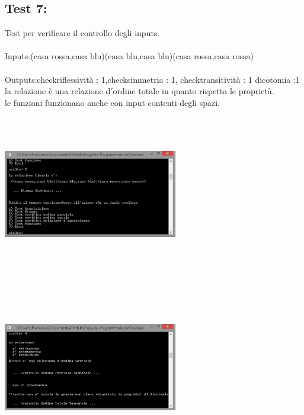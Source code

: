 \documentclass[11pt, a4paper, titlepage, block]{article}
\begin{document}
	\subsection{Test 7:}
	Test per verificare il controllo degli inputs.\\
	\\
	Inputs:(casa rossa,casa blu)(casa blu,casa blu)(casa rossa,casa rossa)\\
	\\
	Outputs:check\textunderscore riflessivit\`a : 1,check\textunderscore simmetria : 1, check\textunderscore transitivit\`a : 1 dicotomia :1
	la relazione \`e una relazione d$'$ordine totale in quanto rispetta le propriet\`a.\\
	le funzioni funzionano anche con input contenti degli spazi.\\
	\includegraphics[width=3in,height=3in,viewport=0 0 300 300]{../Screenshots/Test7Input.png}
	\\
	\includegraphics[width=3in,height=3in,viewport=0 0 300 300]{../Screenshots/Test7Output.png}
	\\
	\\
	\newpage
\end{document}
